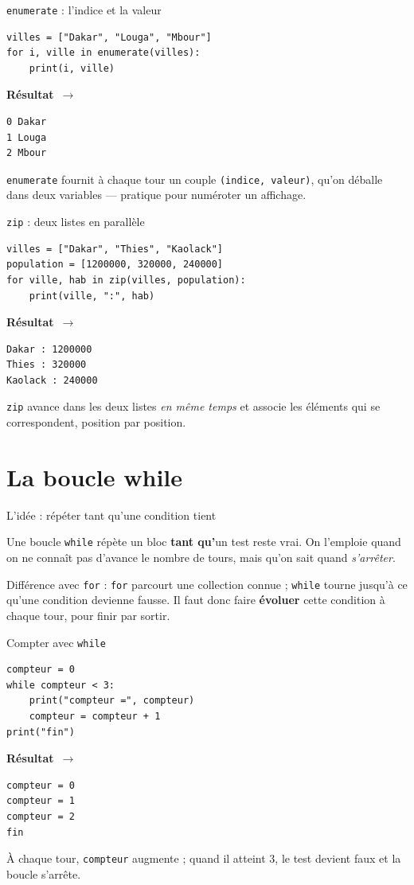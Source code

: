 \documentclass[aspectratio=169,11pt]{beamer}
\newcommand{\resultat}{{\scriptsize\textbf{R\'esultat}~$\rightarrow$}\par\vspace{1pt}}
\begin{document}
\begin{frame}[fragile]{\texttt{enumerate} : l'indice et la valeur}
\begin{lstlisting}
villes = ["Dakar", "Louga", "Mbour"]
for i, ville in enumerate(villes):
    print(i, ville)
\end{lstlisting}
\resultat
\begin{lstlisting}[style=out]
0 Dakar
1 Louga
2 Mbour
\end{lstlisting}
{\small \texttt{enumerate} fournit à chaque tour un couple \texttt{(indice, valeur)}, qu'on déballe dans deux variables — pratique pour numéroter un affichage.}
\end{frame}

\begin{frame}[fragile]{\texttt{zip} : deux listes en parallèle}
\begin{lstlisting}
villes = ["Dakar", "Thies", "Kaolack"]
population = [1200000, 320000, 240000]
for ville, hab in zip(villes, population):
    print(ville, ":", hab)
\end{lstlisting}
\resultat
\begin{lstlisting}[style=out]
Dakar : 1200000
Thies : 320000
Kaolack : 240000
\end{lstlisting}
{\small \texttt{zip} avance dans les deux listes \emph{en même temps} et associe les éléments qui se correspondent, position par position.}
\end{frame}

\section{La boucle while}

\begin{frame}{L'idée : répéter tant qu'une condition tient}
\begin{ucaddef}
{\small Une boucle \texttt{while} répète un bloc \textbf{tant qu'}un test reste vrai. On l'emploie quand on ne connaît pas d'avance le nombre de tours, mais qu'on sait quand \emph{s'arrêter}.}
\end{ucaddef}
{\small Différence avec \texttt{for} : \texttt{for} parcourt une collection connue ; \texttt{while} tourne jusqu'à ce qu'une condition devienne fausse. Il faut donc faire \textbf{évoluer} cette condition à chaque tour, pour finir par sortir.}
\end{frame}

\begin{frame}[fragile]{Compter avec \texttt{while}}
\begin{lstlisting}
compteur = 0
while compteur < 3:
    print("compteur =", compteur)
    compteur = compteur + 1
print("fin")
\end{lstlisting}
\resultat
\begin{lstlisting}[style=out]
compteur = 0
compteur = 1
compteur = 2
fin
\end{lstlisting}
{\small À chaque tour, \texttt{compteur} augmente ; quand il atteint 3, le test devient faux et la boucle s'arrête.}
\end{frame}
\end{document}
